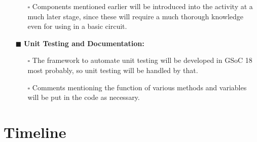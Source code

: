\documentclass[preprint,12pt]{elsarticle}
\begin{document}
\begin{itemize}
\begin{itemize}
			\item[$\square$] {Components mentioned earlier will be introduced into the activity at a much later stage, since these will require a much thorough knowledge even for using in a basic circuit.}
			\end{itemize}
			
		\item[$\blacksquare$] \textbf{Unit Testing and Documentation:}
			\begin{itemize}
			\item[$\square$] {The framework to automate unit testing will be developed in GSoC 18 most probably, so unit testing will be handled by that.}
			
			\item[$\square$] {Comments mentioning the function of various methods and variables will be put in the code as necessary.}
			\end{itemize}
		\end{itemize}
\bigskip\bigskip

\section{Timeline}
\label{S:1}
\end{document}
